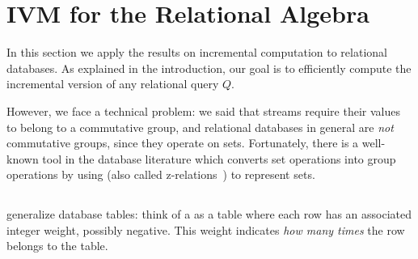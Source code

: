 \section{IVM for the Relational Algebra}\label{sec:relational}

In this section we apply the results on incremental computation to
relational databases.  As explained in the introduction, our goal is
to efficiently compute the incremental version of any relational query
$Q$.

However, we face a technical problem: we said that streams require
their values to belong to a commutative group, and relational
databases in general are \emph{not} commutative groups, since they
operate on sets.  Fortunately, there is a well-known tool in the
database literature which converts set operations into group
operations by using \zrs (also called z-relations~\cite{green-tcs11})
to represent sets.

\subsection{\zrs}

\zrs generalize database tables: think of a \zr as a table where each
row has an associated integer weight, possibly negative.  This weight
indicates \emph{how many times} the row belongs to the table.

%


